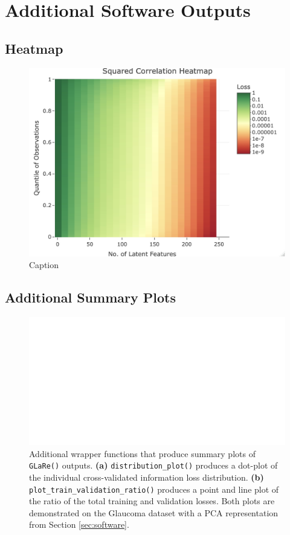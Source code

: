 \section{Additional Software Outputs}\label{sec:additional-outputs}


\subsection{Heatmap}

\begin{figure}
    \centering
    \includegraphics[width=0.75\linewidth]{figures/eye-heatmap.jpeg}
    \caption{Caption}
    \label{fig:eye-heatmap}
\end{figure}

\subsection{Additional Summary Plots}

\begin{figure}
    \centering
    \includegraphics[width=1\linewidth]{figures/additional-plots-01.pdf}
    \caption{Additional wrapper functions that produce summary plots of \texttt{GLaRe()} outputs. \textbf{(a)} \texttt{distribution\_plot()} produces a dot-plot of the individual cross-validated information loss distribution. \textbf{(b)} \texttt{plot\_train\_validation\_ratio()}
    \label{fig:additional-plots-01} produces a point and line plot of the ratio of the total training and validation losses.
    Both plots are demonstrated on the Glaucoma dataset with a PCA representation from Section \ref{sec:software}.}
\end{figure}

